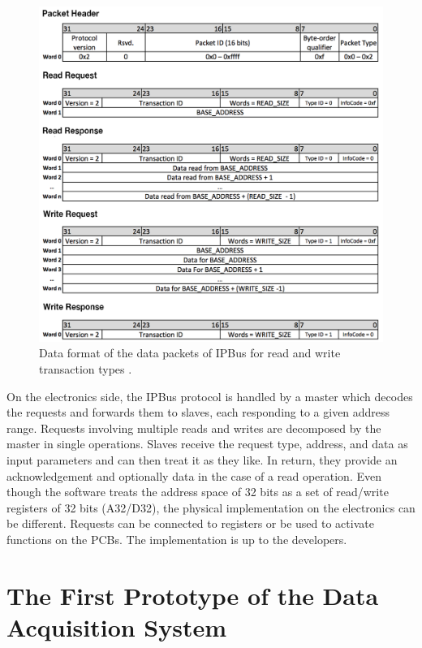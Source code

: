       \begin{figure}[t!]
        \centering
        \includegraphics[width=\textwidth]{img/II-2-daq/ipbus.png}
        \caption{Data format of the data packets of IPBus for read and write transaction types \cite{AMC13}.}
        \label{fig:II-2-ipbus}
      \end{figure}

      On the electronics side, the IPBus protocol is handled by a master which decodes the requests and forwards them to slaves, each responding to a given address range. Requests involving multiple reads and writes are decomposed by the master in single operations. Slaves receive the request type, address, and data as input parameters and can then treat it as they like. In return, they provide an acknowledgement and optionally data in the case of a read operation. Even though the software treats the address space of 32 bits as a set of read/write registers of 32 bits (A32/D32), the physical implementation on the electronics can be different. Requests can be connected to registers or be used to activate functions on the PCBs. The implementation is up to the developers.

  \section{The First Prototype of the Data Acquisition System}

